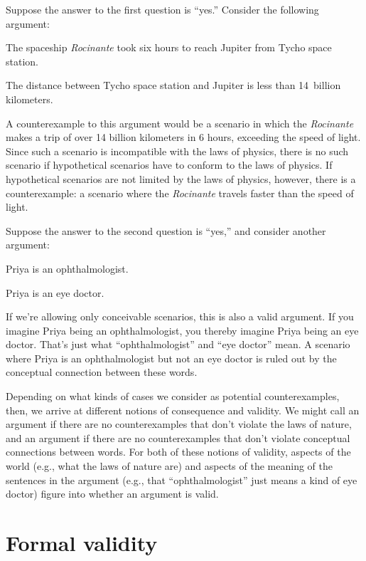 Suppose the answer to the first question is ``yes.'' Consider the following argument:
	\begin{earg}
		\item[] The spaceship \emph{Rocinante} took six hours to reach Jupiter from Tycho space station.
		\item[\therefore] The distance between Tycho space station and Jupiter is less than 14~billion kilometers.
	\end{earg}
A counterexample to this argument would be a scenario in which the \emph{Rocinante} makes a trip of over 14 billion kilometers in 6 hours, exceeding the speed of light. Since such a scenario is incompatible with the laws of physics, there is no such scenario if hypothetical scenarios have to conform to the laws of physics.  If hypothetical scenarios are not limited by the laws of physics, however, there is a counterexample: a scenario where the \emph{Rocinante} travels faster than the speed of light. 

Suppose the answer to the second question is ``yes,'' and consider another argument:
	\begin{earg}
		\item[] Priya is an ophthalmologist.
		\item[\therefore] Priya is an eye doctor.
	\end{earg}
If we're allowing only conceivable scenarios, this is also a valid argument. If you imagine Priya being an ophthalmologist, you thereby imagine Priya being an eye doctor. That's just what ``ophthalmologist'' and ``eye doctor'' mean.  A scenario where Priya is an ophthalmologist but not an eye doctor is ruled out by the conceptual connection between these words.

Depending on what kinds of cases we consider as potential counterexamples, then, we arrive at different notions of consequence and validity. We might call an argument  if there are no counterexamples that don't violate the laws of nature, and an argument  if there are no counterexamples that don't violate conceptual connections between words.
For both of these notions of validity, aspects of the world (e.g., what the laws of nature are) and aspects of the meaning of the sentences in the argument (e.g., that ``ophthalmologist'' just means a kind of eye doctor) figure into whether an argument is valid.

\section{Formal validity}

